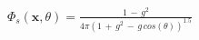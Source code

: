 \begin{align}
\label{eq:hg}
\Phi_s(\textbf{x}, \theta) = \frac{1 \, -\,  g^2}{4\pi (1\, + \, g^2 \, - \, g\, cos(\theta))^{1.5} }
\end{align}